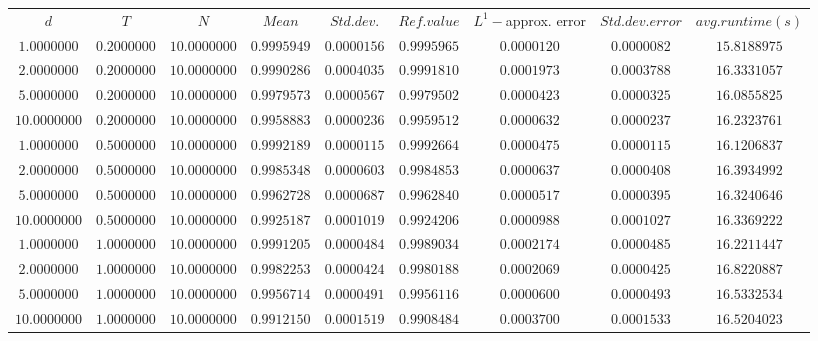 \begin{tabular}{ccccccccc}
$d$ & $T$ & $N$ & $Mean$ & $Std. dev.$ & $Ref. value$ & $L^1-$approx. error & $Std. dev. error$ & $avg. runtime (s)$\\
$1.0000000$ & $0.2000000$ & $10.0000000$ & $0.9995949$ & $0.0000156$ & $0.9995965$ & $0.0000120$ & $0.0000082$ & $15.8188975$\\
$2.0000000$ & $0.2000000$ & $10.0000000$ & $0.9990286$ & $0.0004035$ & $0.9991810$ & $0.0001973$ & $0.0003788$ & $16.3331057$\\
$5.0000000$ & $0.2000000$ & $10.0000000$ & $0.9979573$ & $0.0000567$ & $0.9979502$ & $0.0000423$ & $0.0000325$ & $16.0855825$\\
$10.0000000$ & $0.2000000$ & $10.0000000$ & $0.9958883$ & $0.0000236$ & $0.9959512$ & $0.0000632$ & $0.0000237$ & $16.2323761$\\
$1.0000000$ & $0.5000000$ & $10.0000000$ & $0.9992189$ & $0.0000115$ & $0.9992664$ & $0.0000475$ & $0.0000115$ & $16.1206837$\\
$2.0000000$ & $0.5000000$ & $10.0000000$ & $0.9985348$ & $0.0000603$ & $0.9984853$ & $0.0000637$ & $0.0000408$ & $16.3934992$\\
$5.0000000$ & $0.5000000$ & $10.0000000$ & $0.9962728$ & $0.0000687$ & $0.9962840$ & $0.0000517$ & $0.0000395$ & $16.3240646$\\
$10.0000000$ & $0.5000000$ & $10.0000000$ & $0.9925187$ & $0.0001019$ & $0.9924206$ & $0.0000988$ & $0.0001027$ & $16.3369222$\\
$1.0000000$ & $1.0000000$ & $10.0000000$ & $0.9991205$ & $0.0000484$ & $0.9989034$ & $0.0002174$ & $0.0000485$ & $16.2211447$\\
$2.0000000$ & $1.0000000$ & $10.0000000$ & $0.9982253$ & $0.0000424$ & $0.9980188$ & $0.0002069$ & $0.0000425$ & $16.8220887$\\
$5.0000000$ & $1.0000000$ & $10.0000000$ & $0.9956714$ & $0.0000491$ & $0.9956116$ & $0.0000600$ & $0.0000493$ & $16.5332534$\\
$10.0000000$ & $1.0000000$ & $10.0000000$ & $0.9912150$ & $0.0001519$ & $0.9908484$ & $0.0003700$ & $0.0001533$ & $16.5204023$\\
\end{tabular}
